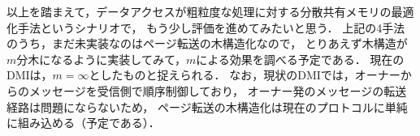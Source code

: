 \documentclass[10pt]{jsarticle}
\begin{document}
以上を踏まえて，データアクセスが粗粒度な処理に対する分散共有メモリの最適化手法というシナリオで，
もう少し評価を進めてみたいと思う．
上記の4手法のうち，まだ未実装なのはページ転送の木構造化なので，
とりあえず木構造が$m$分木になるように実装してみて，$m$による効果を調べる予定である．
現在のDMIは，$m=\infty$としたものと捉えられる．
なお，現状のDMIでは，オーナーからのメッセージを受信側で順序制御しており，
オーナー発のメッセージの転送経路は問題にならないため，
ページ転送の木構造化は現在のプロトコルに単純に組み込める（予定である）．
\end{document}
